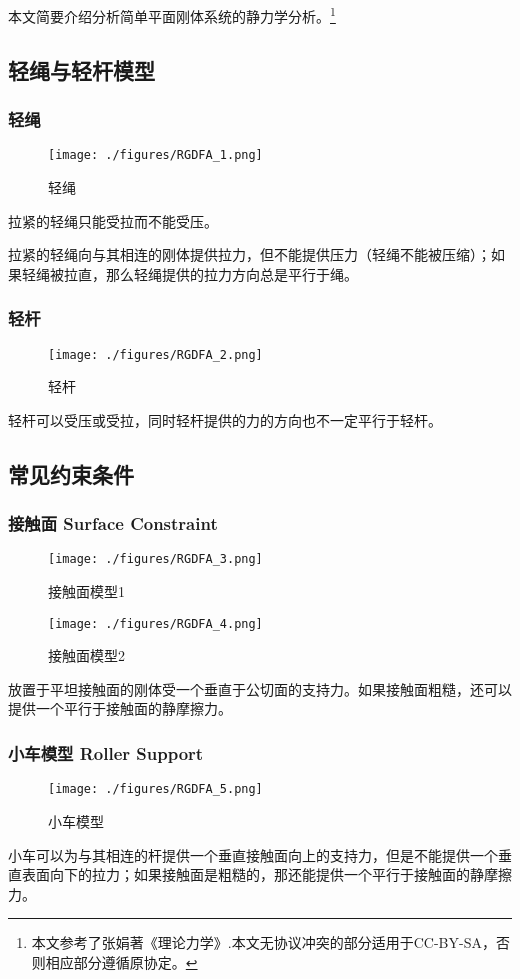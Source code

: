 
本文简要介绍分析简单平面刚体系统的静力学分析。\footnote{本文参考了张娟著《理论力学》.本文无协议冲突的部分适用于CC-BY-SA，否则相应部分遵循原协定。}

\subsection{轻绳与轻杆模型}
\subsubsection{轻绳}
\begin{figure}[ht]
\centering
\texttt{[image: ./figures/RGDFA\_1.png]}
\caption{轻绳} \label{RGDFA_fig1}
\end{figure}
拉紧的轻绳只能受拉而不能受压。

拉紧的轻绳向与其相连的刚体提供拉力，但不能提供压力（轻绳不能被压缩）；如果轻绳被拉直，那么轻绳提供的拉力方向总是平行于绳。

\subsubsection{轻杆}
\begin{figure}[ht]
\centering
\texttt{[image: ./figures/RGDFA\_2.png]}
\caption{轻杆} \label{RGDFA_fig2}
\end{figure}
轻杆可以受压或受拉，同时轻杆提供的力的方向也不一定平行于轻杆。

\subsection{常见约束条件}
\subsubsection{接触面 Surface Constraint}
\begin{figure}[ht]
\centering
\texttt{[image: ./figures/RGDFA\_3.png]}
\caption{接触面模型1} \label{RGDFA_fig3}
\end{figure}
\begin{figure}[ht]
\centering
\texttt{[image: ./figures/RGDFA\_4.png]}
\caption{接触面模型2} \label{RGDFA_fig4}
\end{figure}
放置于平坦接触面的刚体受一个垂直于公切面的支持力。如果接触面粗糙，还可以提供一个平行于接触面的静摩擦力。
\subsubsection{小车模型 Roller Support}
\begin{figure}[ht]
\centering
\texttt{[image: ./figures/RGDFA\_5.png]}
\caption{小车模型} \label{RGDFA_fig5}
\end{figure}
小车可以为与其相连的杆提供一个垂直接触面向上的支持力，但是不能提供一个垂直表面向下的拉力；如果接触面是粗糙的，那还能提供一个平行于接触面的静摩擦力。

